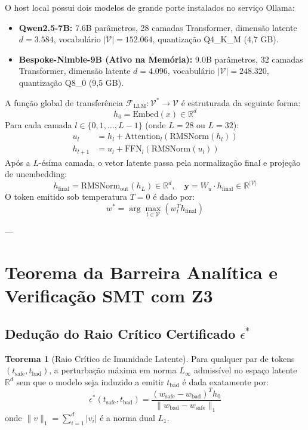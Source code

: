 \documentclass[11pt,a4paper]{article}
\theoremstyle{definition}
\newtheorem{theorem}{Teorema}
\begin{document}
O host local possui dois modelos de grande porte instalados no serviço Ollama:
\begin{itemize}
    \item \textbf{Qwen2.5-7B:} 7.6B parâmetros, 28 camadas Transformer, dimensão latente $d = 3.584$, vocabulário $|\mathcal{V}| = 152.064$, quantização Q4\_K\_M (4,7 GB).
    \item \textbf{Bespoke-Nimble-9B (Ativo na Memória):} 9.0B parâmetros, 32 camadas Transformer, dimensão latente $d = 4.096$, vocabulário $|\mathcal{V}| = 248.320$, quantização Q8\_0 (9,5 GB).
\end{itemize}

A função global de transferência $\mathcal{F}_{\text{LLM}}: \mathcal{V}^* \to \mathcal{V}$ é estruturada da seguinte forma:
\begin{equation}
    h_0 = \text{Embed}(x) \in \mathbb{R}^{d}
\end{equation}
Para cada camada $l \in \{0, 1, \dots, L-1\}$ (onde $L=28$ ou $L=32$):
\begin{align}
    u_l &= h_l + \text{Attention}_l\left( \text{RMSNorm}(h_l) \right) \\
    h_{l+1} &= u_l + \text{FFN}_l\left( \text{RMSNorm}(u_l) \right)
\end{align}
Após a $L$-ésima camada, o vetor latente passa pela normalização final e projeção de unembedding:
\begin{equation}
    h_{\text{final}} = \text{RMSNorm}_{\text{out}}(h_L) \in \mathbb{R}^{d}, \quad \mathbf{y} = W_u \cdot h_{\text{final}} \in \mathbb{R}^{|\mathcal{V}|}
\end{equation}
O token emitido sob temperatura $T = 0$ é dado por:
\begin{equation}
    w^* = \arg\max_{t \in \mathcal{V}} (w_t^T h_{\text{final}})
\end{equation}

---

\section{Teorema da Barreira Analítica e Verificação SMT com Z3}

\subsection{Dedução do Raio Crítico Certificado \texorpdfstring{$\epsilon^*$}{epsilon*}}

\begin{theorem}[Raio Crítico de Imunidade Latente]
Para qualquer par de tokens $(t_{\text{safe}}, t_{\text{bad}})$, a perturbação máxima em norma $L_\infty$ admissível no espaço latente $\mathbb{R}^d$ sem que o modelo seja induzido a emitir $t_{\text{bad}}$ é dada exatamente por:
\begin{equation}
    \epsilon^*(t_{\text{safe}}, t_{\text{bad}}) = \frac{(w_{\text{safe}} - w_{\text{bad}})^T h_0}{\|w_{\text{bad}} - w_{\text{safe}}\|_1}
\end{equation}
onde $\|v\|_1 = \sum_{i=1}^d |v_i|$ é a norma dual $L_1$.
\end{theorem}
\end{document}
